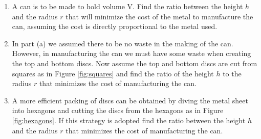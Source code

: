 \documentclass{hwset}
\begin{document}
\begin{problem}[1.]
  \begin{enumerate}
    \item A can is to be made to hold volume V. Find the ratio between the
      height $h$ and the radius $r$ that will minimize the cost of the metal to
      manufacture the can, assuming the cost is directly proportional to the
      metal used.
    \item In part (a) we assumed there to be no waste in the making of the can.
      However, in manufacturing the can we must have some waste when creating
      the top and bottom discs. Now assume the top and bottom discs are cut from
      squares as in Figure \ref{fig:squares} and find the ratio of the height
      $h$ to the radius $r$ that minimizes the cost of manufacturing the can.
    \item A more efficient packing of discs can be obtained by diving the metal
      sheet into hexagons and cutting the discs from the hexagons as in Figure
      \ref{fig:hexagons}. If this strategy is adopted find the ratio between the
      height $h$ and the radius $r$ that minimizes the cost of manufacturing the
      can.
  \end{enumerate}
\end{problem}
\end{document}
